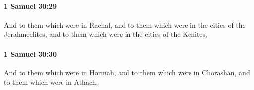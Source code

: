 		\paragraph{1 Samuel 30:29} %
			\label{1SAMUEL-30-29}

			And to them which were in Rachal, and to them which were in the cities of the Jerahmeelites, and to them which were in the cities of the Kenites,


		\paragraph{1 Samuel 30:30} %
			\label{1SAMUEL-30-30}

			And to them which were in Hormah, and to them which were in Chorashan, and to them which were in Athach,



